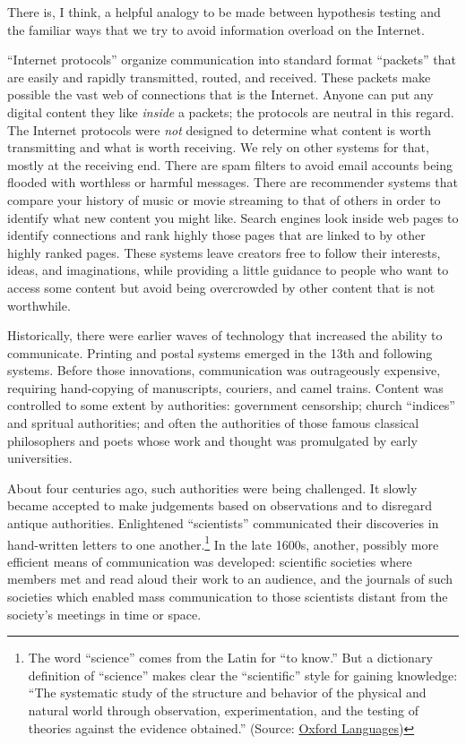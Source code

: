 \documentclass[
  letterpaper,
  DIV=11,
  numbers=noendperiod,
  oneside]{scrreprt}
\begin{document}
There is, I think, a helpful analogy to be made between hypothesis
testing and the familiar ways that we try to avoid information overload
on the Internet.

``Internet protocols'' organize communication into standard format
``packets'' that are easily and rapidly transmitted, routed, and
received. These packets make possible the vast web of connections that
is the Internet. Anyone can put any digital content they like
\emph{inside} a packets; the protocols are neutral in this regard. The
Internet protocols were \emph{not} designed to determine what content is
worth transmitting and what is worth receiving. We rely on other systems
for that, mostly at the receiving end. There are spam filters to avoid
email accounts being flooded with worthless or harmful messages. There
are recommender systems that compare your history of music or movie
streaming to that of others in order to identify what new content you
might like. Search engines look inside web pages to identify connections
and rank highly those pages that are linked to by other highly ranked
pages. These systems leave creators free to follow their interests,
ideas, and imaginations, while providing a little guidance to people who
want to access some content but avoid being overcrowded by other content
that is not worthwhile.

Historically, there were earlier waves of technology that increased the
ability to communicate. Printing and postal systems emerged in the 13th
and following systems. Before those innovations, communication was
outrageously expensive, requiring hand-copying of manuscripts, couriers,
and camel trains. Content was controlled to some extent by authorities:
government censorship; church ``indices'' and spritual authorities; and
often the authorities of those famous classical philosophers and poets
whose work and thought was promulgated by early universities.

About four centuries ago, such authorities were being challenged. It
slowly became accepted to make judgements based on observations and to
disregard antique authorities. Enlightened ``scientists'' communicated
their discoveries in hand-written letters to one another.\footnote{The
  word ``science'' comes from the Latin for ``to know.'' But a
  dictionary definition of ``science'' makes clear the ``scientific''
  style for gaining knowledge: ``The systematic study of the structure
  and behavior of the physical and natural world through observation,
  experimentation, and the testing of theories against the evidence
  obtained.'' (Source:
  \href{https://languages.oup.com/google-dictionary-en/}{Oxford
  Languages})} In the late 1600s, another, possibly more efficient means
of communication was developed: scientific societies where members met
and read aloud their work to an audience, and the journals of such
societies which enabled mass communication to those scientists distant
from the society's meetings in time or space.
\end{document}
